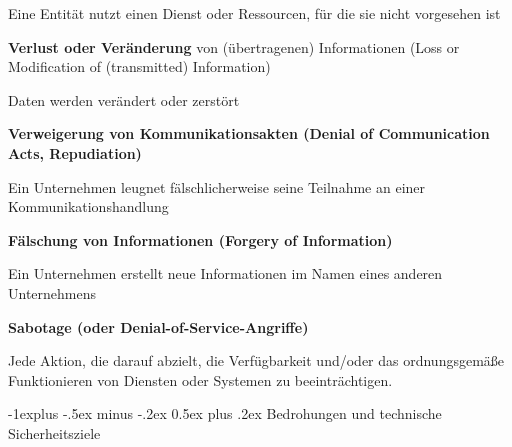 \documentclass[a4paper]{article}
\makeatletter
\renewcommand{\subsection}{\@startsection{subsection}{2}{0mm}%
 {-1explus -.5ex minus -.2ex}%
 {0.5ex plus .2ex}%
 {\normalfont\normalsize\bfseries}}
\makeatother
\begin{document}
\begin{multicols}{3}
\begin{itemize*}
            \begin{itemize*}
                  \item Eine Entität nutzt einen Dienst oder Ressourcen, für die sie nicht vorgesehen ist
            \end{itemize*}
            \item
            \textbf{Verlust oder Veränderung} von (übertragenen) Informationen
            (Loss or Modification of (transmitted) Information)

            \begin{itemize*}
                  \item Daten werden verändert oder zerstört
            \end{itemize*}
            \item
            \textbf{Verweigerung von Kommunikationsakten (Denial of Communication
                  Acts, Repudiation)}

            \begin{itemize*}
                  \item Ein Unternehmen leugnet fälschlicherweise seine Teilnahme an einer Kommunikationshandlung
            \end{itemize*}
            \item
            \textbf{Fälschung von Informationen (Forgery of Information)}

            \begin{itemize*}
                  \item Ein Unternehmen erstellt neue Informationen im Namen eines anderen Unternehmens
            \end{itemize*}
            \item
            \textbf{Sabotage (oder Denial-of-Service-Angriffe)}

            \begin{itemize*}
                  \item Jede Aktion, die darauf abzielt, die Verfügbarkeit und/oder das ordnungsgemäße Funktionieren von Diensten oder Systemen zu beeinträchtigen.
            \end{itemize*}
      \end{itemize*}


      \subsection{Bedrohungen und technische
            Sicherheitsziele}


\end{multicols}
\end{document}
